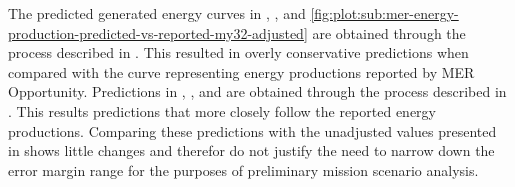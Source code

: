 The predicted generated energy curves in , , and \ref{fig:plot:sub:mer-energy-production-predicted-vs-reported-my32-adjusted} are obtained through the process described in . This resulted in overly conservative predictions when compared with the curve representing energy productions reported by MER Opportunity. Predictions in , , and  are obtained through the process described in . This results predictions that more closely follow the reported energy productions. Comparing these predictions with the unadjusted values presented in  shows little changes and therefor do not justify the need to narrow down the error margin range for the purposes of preliminary mission scenario analysis.

